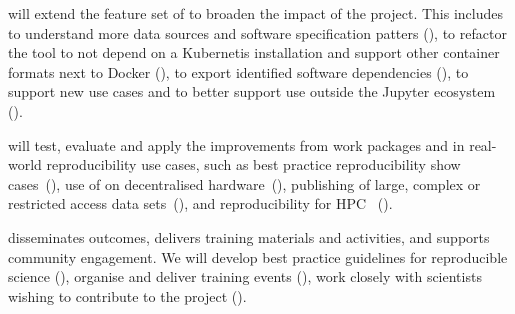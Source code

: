      will extend the feature set of \repotodocker{} to broaden
    the impact of the project. This
    includes to understand more data sources and software specification patters
    (), to refactor the tool to not depend on a
    Kubernetis installation and support other container formats next to Docker
    (), to export identified software dependencies
    (), to support new use cases and to
    better support use outside the Jupyter ecosystem ().

     will test, evaluate and apply the improvements from
    work packages  and  in real-world
    reproducibility use cases, such as best practice reproducibility show
    cases~(), use of \repotodocker{} on
    decentralised hardware~(), publishing
    of large, complex or restricted access data
    sets~(), and reproducibility for HPC~
    ().

     disseminates outcomes, delivers training materials
    and activities, and supports community engagement. We will develop best practice guidelines for reproducible
    science (), organise and deliver
    training events (), work closely with
    scientists wishing to contribute to the project ().

